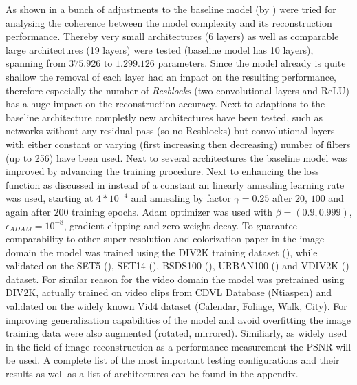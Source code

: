 As shown in  a bunch of adjustments to the
baseline model (by \cite{TAID}) were tried for analysing the coherence between
the model complexity and its reconstruction performance. Thereby very small
architectures (6 layers) as well as comparable large architectures
(19 layers) were tested (baseline model has 10 layers), spanning
from $375.926$ to $1.299.126$ parameters. Since the model already is quite
shallow the removal of each layer had an impact on the resulting performance,
therefore especially the number of \textit{Resblocks} (two convolutional layers
and ReLU) has a huge impact on the reconstruction accuracy. Next to adaptions
to the baseline architecture completly new architectures have been tested, such
as networks without any residual pass (so no Resblocks) but convolutional layers
with either constant or varying (first increasing then decreasing) number of
filters (up to 256) have been used.
\newline
Next to several architectures the baseline model was improved by advancing the
training procedure. Next to enhancing the loss function as discussed in
 instead of a constant an linearly annealing learning
rate was used, starting at $4*10^{-4}$ and annealing by factor $\gamma = 0.25$
after $20$, $100$ and again after $200$ training epochs. Adam optimizer was used
with $\beta = (0.9, 0.999)$, $\epsilon_{ADAM} = 10^{-8}$, gradient clipping and
zero weight decay.
\newline
To guarantee comparability to other super-resolution and colorization paper
in the image domain the model was trained using the DIV2K training dataset
(\cite{DIV2K}), while validated on the SET5 (\cite{SET5}), SET14 (\cite{SET14}),
BSDS100 (\cite{BSDS100}), URBAN100 (\cite{URBAN100}) and VDIV2K (\cite{DIV2K})
dataset. For similar reason for the video domain the model was pretrained using
DIV2K, actually trained on video clips from CDVL Database (Ntiaspen) and
validated on the widely known Vid4 dataset (Calendar, Foliage, Walk, City).
For improving generalization capabilities of the model and avoid overfitting
the image training data were also augmented (rotated, mirrored).
\newline
Similiarly, as widely used in the field of image reconstruction as a performance
measurement the \ac{PSNR} will be used.
\newline
A complete list of the most important testing configurations and their results
as well as a list of architectures can be found in the appendix.

